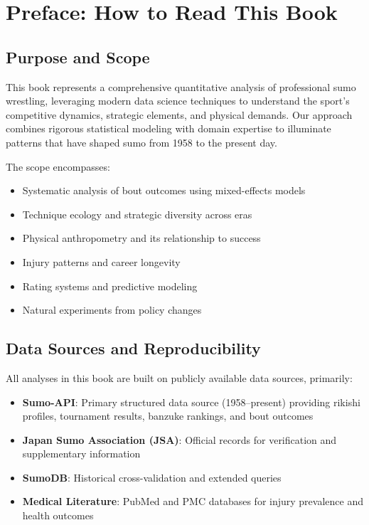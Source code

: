 \chapter*{Preface: How to Read This Book}

\section*{Purpose and Scope}

This book represents a comprehensive quantitative analysis of professional sumo wrestling, leveraging modern data science techniques to understand the sport's competitive dynamics, strategic elements, and physical demands. Our approach combines rigorous statistical modeling with domain expertise to illuminate patterns that have shaped sumo from 1958 to the present day.

The scope encompasses:
\begin{itemize}
\item Systematic analysis of bout outcomes using mixed-effects models
\item Technique ecology and strategic diversity across eras
\item Physical anthropometry and its relationship to success
\item Injury patterns and career longevity
\item Rating systems and predictive modeling
\item Natural experiments from policy changes
\end{itemize}

\section*{Data Sources and Reproducibility}

All analyses in this book are built on publicly available data sources, primarily:

\begin{itemize}
\item \textbf{Sumo-API}: Primary structured data source (1958--present) providing rikishi profiles, tournament results, banzuke rankings, and bout outcomes
\item \textbf{Japan Sumo Association (JSA)}: Official records for verification and supplementary information
\item \textbf{SumoDB}: Historical cross-validation and extended queries
\item \textbf{Medical Literature}: PubMed and PMC databases for injury prevalence and health outcomes
\end{itemize}


